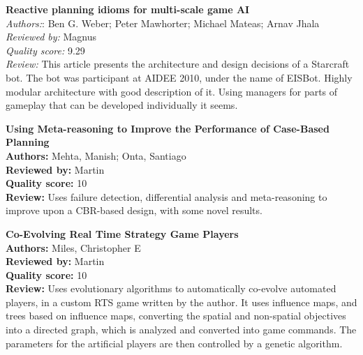 \textbf{Reactive planning idioms for multi-scale game AI}\\
\textit{Authors:}: Ben G. Weber; Peter Mawhorter; Michael Mateas; Arnav Jhala\\
\textit{Reviewed by:} Magnus\\
\textit{Quality score:} 9.29\\
\textit{Review:} This article presents the architecture and design decisions of a Starcraft bot. The bot was participant at AIDEE 2010, under the name of EISBot. Highly modular architecture with good description of it. Using managers for parts of gameplay that can be developed individually it seems.

\textbf{Using Meta-reasoning to Improve the Performance of Case-Based Planning}\\
\textbf{Authors:} Mehta, Manish; Onta, Santiago\\
\textbf{Reviewed by:} Martin\\
\textbf{Quality score:} 10\\
\textbf{Review:} Uses failure detection, differential analysis and meta-reasoning to improve upon a CBR-based design, with some novel results.

\textbf{Co-Evolving Real Time Strategy Game Players}\\
\textbf{Authors:} Miles, Christopher E\\
\textbf{Reviewed by:} Martin\\
\textbf{Quality score:} 10\\
\textbf{Review:} Uses evolutionary algorithms to automatically co-evolve automated players, in a custom RTS game written by the author. It uses influence maps, and trees based on influence maps, converting the spatial and non-spatial objectives into a directed graph, which is analyzed and converted into game commands. The parameters for the artificial players are then controlled by a genetic algorithm.
